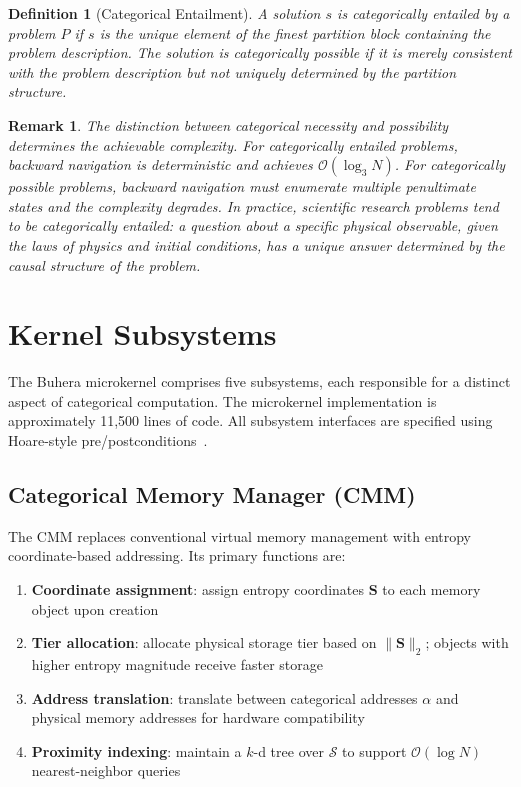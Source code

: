 \documentclass[12pt,twocolumn]{article}
\newtheorem{definition}{Definition}[section]
\newtheorem{remark}{Remark}[section]
\begin{document}
\begin{definition}[Categorical Entailment]
A solution $s$ is \emph{categorically entailed} by a problem $P$ if $s$ is the unique element of the finest partition block containing the problem description. The solution is \emph{categorically possible} if it is merely consistent with the problem description but not uniquely determined by the partition structure.
\end{definition}

\begin{remark}
The distinction between categorical necessity and possibility determines the achievable complexity. For categorically entailed problems, backward navigation is deterministic and achieves $\mathcal{O}(\log_3 N)$. For categorically possible problems, backward navigation must enumerate multiple penultimate states and the complexity degrades. In practice, scientific research problems tend to be categorically entailed: a question about a specific physical observable, given the laws of physics and initial conditions, has a unique answer determined by the causal structure of the problem.
\end{remark}

\section{Kernel Subsystems}
\label{sec:subsystems}

The Buhera microkernel comprises five subsystems, each responsible for a distinct aspect of categorical computation. The microkernel implementation is approximately 11,500 lines of code. All subsystem interfaces are specified using Hoare-style pre/postconditions~\cite{hoare1969axiomatic}.

\subsection{Categorical Memory Manager (CMM)}

The CMM replaces conventional virtual memory management with entropy coordinate-based addressing. Its primary functions are:

\begin{enumerate}
\item \textbf{Coordinate assignment}: assign entropy coordinates $\mathbf{S}$ to each memory object upon creation
\item \textbf{Tier allocation}: allocate physical storage tier based on $\|\mathbf{S}\|_2$; objects with higher entropy magnitude receive faster storage
\item \textbf{Address translation}: translate between categorical addresses $\alpha$ and physical memory addresses for hardware compatibility
\item \textbf{Proximity indexing}: maintain a $k$-d tree over $\mathcal{S}$ to support $\mathcal{O}(\log N)$ nearest-neighbor queries
\end{enumerate}
\end{document}
